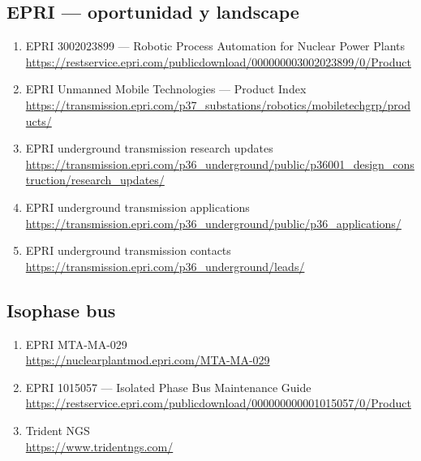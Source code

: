 \documentclass[11pt,a4paper]{article}
\begin{document}
\subsection*{EPRI — oportunidad y landscape}
\begin{enumerate}
\item EPRI 3002023899 — Robotic Process Automation for Nuclear Power Plants \\
\url{https://restservice.epri.com/publicdownload/000000003002023899/0/Product}
\item EPRI Unmanned Mobile Technologies — Product Index \\
\url{https://transmission.epri.com/p37_substations/robotics/mobiletechgrp/products/}
\item EPRI underground transmission research updates \\
\url{https://transmission.epri.com/p36_underground/public/p36001_design_construction/research_updates/}
\item EPRI underground transmission applications \\
\url{https://transmission.epri.com/p36_underground/public/p36_applications/}
\item EPRI underground transmission contacts \\
\url{https://transmission.epri.com/p36_underground/leads/}
\end{enumerate}


\subsection*{Isophase bus}
\begin{enumerate}[start=6]
\item EPRI MTA-MA-029 \\
\url{https://nuclearplantmod.epri.com/MTA-MA-029}
\item EPRI 1015057 — Isolated Phase Bus Maintenance Guide \\
\url{https://restservice.epri.com/publicdownload/000000000001015057/0/Product}
\item Trident NGS \\
\url{https://www.tridentngs.com/}
\end{enumerate}
\end{document}
